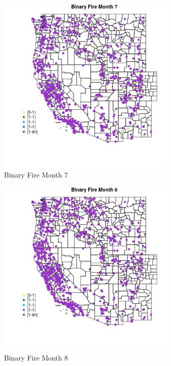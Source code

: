 \begin{figure} 
\centering  
\includegraphics[width=0.77\textwidth]{Code_Outputs/Report_ML_input_PM25_Step4_part_f_de_duplicated_aveswNAs_MapObsMo7Binary_Fire.jpg} 
\caption{\label{fig:Report_ML_input_PM25_Step4_part_f_de_duplicated_aveswNAsMapObsMo7Binary_Fire}Binary Fire Month 7} 
\end{figure} 
 

\begin{figure} 
\centering  
\includegraphics[width=0.77\textwidth]{Code_Outputs/Report_ML_input_PM25_Step4_part_f_de_duplicated_aveswNAs_MapObsMo8Binary_Fire.jpg} 
\caption{\label{fig:Report_ML_input_PM25_Step4_part_f_de_duplicated_aveswNAsMapObsMo8Binary_Fire}Binary Fire Month 8} 
\end{figure} 
 

